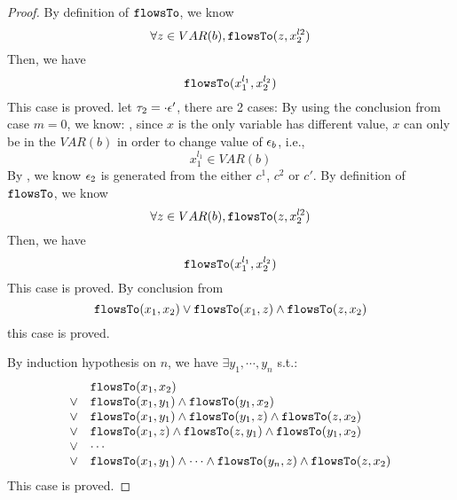 \begin{proof}
 By definition of $\mathtt{flowsTo}$, we know
 \[
 \forall z \in VAR(b), \mathtt{flowsTo}(z, x_2^{l2})
 \]
 Then, we have
 \[
 \mathtt{flowsTo}(x_1^{l_1}, x_2^{l_2})
 \]
 This case is proved.
%
 let $\mathtt{\tau}_2 = \cdot \mathtt{\epsilon}'$, there are 2 cases:
By using the conclusion from case $m = 0$, we know:
, since $x$ is the only variable has different value, $x$ can only be in the $VAR(b)$ in order to change value of $\mathtt{\epsilon}_b$, i.e.,
 \[
 x_1^{l_1} \in VAR(b)
 \]
 By , we know $\mathtt{\epsilon}_2$ is generated from the either $c^1$, $c^2$ or $c'$.
 By definition of $\mathtt{flowsTo}$, we know
 \[
 \forall z \in VAR(b), \mathtt{flowsTo}(z, x_2^{l2})
 \]
 Then, we have
 \[
 \mathtt{flowsTo}(x_1^{l_1}, x_2^{l_2})
 \]
  This case is proved.
%
By conclusion from 
\[
  \mathtt{flowsTo}(x_1, x_2) \lor \mathtt{flowsTo}(x_1, z) \land \mathtt{flowsTo}(z, x_2)
\]
this case is proved.

By induction hypothesis on $n$, we have $\exists y_1, \cdots, y_n$ s.t.:
\[
\begin{array}{ll}
      & \mathtt{flowsTo}(x_1, x_2) \\
  \lor  & \mathtt{flowsTo}(x_1, y_1) \land \mathtt{flowsTo}(y_1, x_2)\\
  \lor  & \mathtt{flowsTo}(x_1, y_1) \land \mathtt{flowsTo}(y_1, z) \land \mathtt{flowsTo}(z, x_2) \\
  \lor  & \mathtt{flowsTo}(x_1, z) \land \mathtt{flowsTo}(z, y_1) \land \mathtt{flowsTo}(y_1, x_2) \\
  \lor  & \cdots \\
  \lor  & \mathtt{flowsTo}(x_1, y_1) \land \cdots \land \mathtt{flowsTo}(y_n, z) \land \mathtt{flowsTo}(z, x_2) \\
\end{array}
\]
This case is proved.
\end{proof}